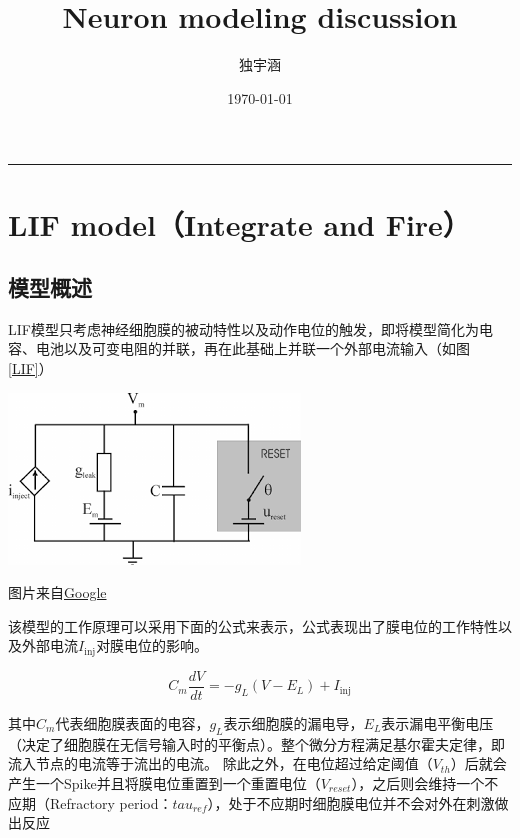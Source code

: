 \documentclass[nols, a4paper]{tufte-handout}
\title{Neuron modeling discussion}
\author{独宇涵}
\date{\today}
\begin{document}
\onehalfspacing 

\maketitle

\tableofcontents

\bigskip
\noindent\rule{\linewidth}{0.4pt}
\bigskip

\section{LIF model（Integrate and Fire）}

\subsection{模型概述} 

LIF模型只考虑神经细胞膜的被动特性以及动作电位的触发，即将模型简化为电容、电池以及可变电阻的并联，再在此基础上并联一个外部电流输入（如图 \ref{LIF}）

\begin{marginfigure}
  \includegraphics[width=\linewidth]{image/LIF.png} 
  \caption{图片来自\href{https://www.researchgate.net/figure/Simplied-circuit-of-the-LIF-neuron-model_fig1_232262611}{Google}}
  \label{LIF}
\end{marginfigure}

该模型的工作原理可以采用下面的公式来表示，公式表现出了膜电位的工作特性以及外部电流$I_\text{inj}$对膜电位的影响。

\[
C_m \frac{dV}{dt} = -g_L (V - E_L) + I_\text{inj}
\]

其中$C_m$代表细胞膜表面的电容，$g_L$表示细胞膜的漏电导，$E_L$表示漏电平衡电压（决定了细胞膜在无信号输入时的平衡点）。整个微分方程满足基尔霍夫定律，即流入节点的电流等于流出的电流。
除此之外，在电位超过给定阈值（$V_{th}$）后就会产生一个Spike并且将膜电位重置到一个重置电位（$V_{reset}$），之后则会维持一个不应期（Refractory period：$tau_{ref}$），处于不应期时细胞膜电位并不会对外在刺激做出反应
\end{document}
